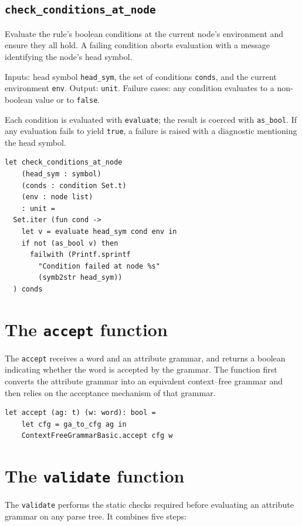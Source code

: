 \subsection{\texttt{check\_conditions\_at\_node}}

Evaluate the rule's boolean conditions at the current node's environment and ensure they all hold. A failing condition aborts evaluation with a message 
identifying the node's head symbol. 

Inputs: head symbol \texttt{head\_sym}, the set of conditions \texttt{conds}, and the current environment \texttt{env}.  
Output: \texttt{unit}.  
Failure cases: any condition evaluates to a non-boolean value or to \texttt{false}. 

Each condition is evaluated with \texttt{evaluate}; the result is coerced with \texttt{as\_bool}. If any evaluation fails to yield \texttt{true}, 
a failure is raised with a diagnostic mentioning the head symbol. 

\begin{verbatim}
let check_conditions_at_node
    (head_sym : symbol)
    (conds : condition Set.t)
    (env : node list)
    : unit =
  Set.iter (fun cond ->
    let v = evaluate head_sym cond env in
    if not (as_bool v) then
      failwith (Printf.sprintf
        "Condition failed at node %s"
        (symb2str head_sym))
  ) conds
\end{verbatim}


\section{The \texttt{accept} function}

The \texttt{accept} receives
a word and an attribute grammar, and returns a boolean indicating whether the word
is accepted by the grammar. The function first converts the attribute grammar into an
equivalent context--free grammar and then relies on the acceptance mechanism of that
grammar.

\begin{verbatim}
let accept (ag: t) (w: word): bool =
    let cfg = ga_to_cfg ag in
    ContextFreeGrammarBasic.accept cfg w
\end{verbatim}



\section{ The \texttt{validate} function}
The \texttt{validate} performs the static checks required before evaluating an attribute grammar on any parse tree. It combines five steps:

